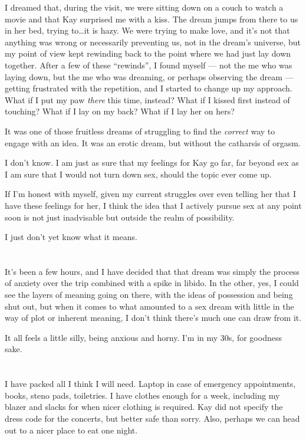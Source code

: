 I dreamed that, during the visit, we were sitting down on a couch to watch a movie and that Kay surprised me with a kiss. The dream jumps from there to us in her bed, trying to\ldots it is hazy. We were trying to make love, and it's not that anything was wrong or necessarily preventing us, not in the dream's universe, but my point of view kept rewinding back to the point where we had just lay down together. After a few of these ``rewinds'', I found myself --- not the me who was laying down, but the me who was dreaming, or perhaps observing the dream --- getting frustrated with the repetition, and I started to change up my approach. What if I put my paw \emph{there} this time, instead? What if I kissed first instead of touching? What if I lay on my back? What if I lay her on hers?

It was one of those fruitless dreams of struggling to find the \emph{correct} way to engage with an idea. It was an erotic dream, but without the catharsis of orgasm.

I don't know. I am just as sure that my feelings for Kay go far, far beyond sex as I am sure that I would not turn down sex, should the topic ever come up.

If I'm honest with myself, given my current struggles over even telling her that I have these feelings for her, I think the idea that I actively pursue sex at any point soon is not just inadvisable but outside the realm of possibility.

I just don't yet know what it means.

\section{}

It's been a few hours, and I have decided that that dream was simply the process of anxiety over the trip combined with a spike in libido. In the other, yes, I could see the layers of meaning going on there, with the ideas of possession and being shut out, but when it comes to what amounted to a sex dream with little in the way of plot or inherent meaning, I don't think there's much one can draw from it.

It all feels a little silly, being anxious and horny. I'm in my 30s, for goodness sake.

\section{}

I have packed all I think I will need. Laptop in case of emergency appointments, books, steno pads, toiletries. I have clothes enough for a week, including my blazer and slacks for when nicer clothing is required. Kay did not specify the dress code for the concerts, but better safe than sorry. Also, perhaps we can head out to a nicer place to eat one night.

